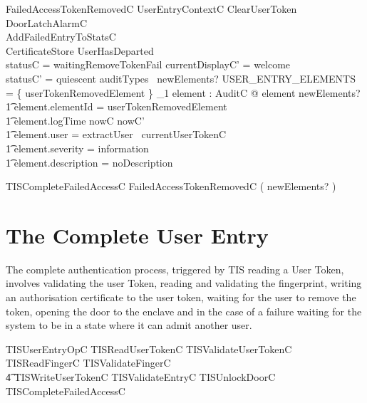 \begin{schema}{FailedAccessTokenRemovedC}
        UserEntryContextC
\also
	ClearUserToken
\\      \Xi DoorLatchAlarmC
\\      AddFailedEntryToStatsC
\\      \Xi CertificateStore
\where
        UserHasDeparted
\\      statusC = waitingRemoveTokenFail
\also
        currentDisplayC' = welcome
\\      statusC' = quiescent
\also
        auditTypes~ newElements? \cap USER\_ENTRY\_ELEMENTS = 
        \{ userTokenRemovedElement \} 
\also
        \exists_1 element : AuditC @ element \in newElements? 
\\ \t1  \land element.elementId = userTokenRemovedElement
\\ \t1  \land element.logTime \in nowC \upto nowC'
\\ \t1  \land element.user = extractUser~ currentUserTokenC
\\ \t1  \land element.severity = information
\\ \t1  \land element.description = noDescription
\end{schema}


\begin{zed}
        TISCompleteFailedAccessC  FailedAccessTokenRemovedC  
        \hide ( newElements? )
\end{zed}

\section{The Complete User Entry}
The complete authentication process, triggered by TIS reading a User
Token, involves validating the user Token, reading and validating the
fingerprint, 
writing an authorisation certificate to the user token, waiting for
the user to remove the token, opening the door to the enclave and
in the case of a failure waiting for the system to
be in a state where it can admit another user.

\begin{zed}
        TISUserEntryOpC  TISReadUserTokenC 
                \lor TISValidateUserTokenC 
                \lor TISReadFingerC 
                \lor TISValidateFingerC 
\\ \t4          \lor TISWriteUserTokenC   
                \lor TISValidateEntryC 
                \lor TISUnlockDoorC 
                \lor TISCompleteFailedAccessC 
\end{zed}

